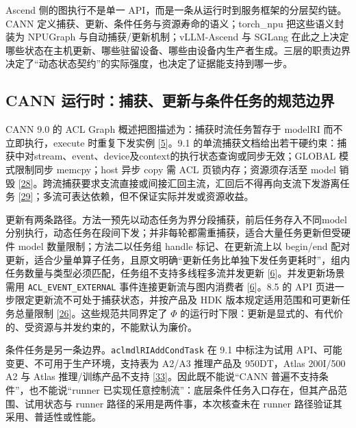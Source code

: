 \documentclass[
  UTF8,
  zihao=5]{ctexart}
\begin{document}
Ascend 侧的图执行不是单一
API，而是一条从运行时到服务框架的分层契约链。CANN
定义捕获、更新、条件任务与资源寿命的语义；torch\_npu 把这些语义封装为
NPUGraph 与自动捕获/更新机制；vLLM-Ascend 与 SGLang
在此之上决定哪些状态在主机更新、哪些驻留设备、哪些由设备内生产者生成。三层的职责边界决定了``动态状态契约''的实际强度，也决定了证据能支持到哪一步。

\hypertarget{cann-ux8fd0ux884cux65f6ux6355ux83b7ux66f4ux65b0ux4e0eux6761ux4ef6ux4efbux52a1ux7684ux89c4ux8303ux8fb9ux754c}{%
\subsection{CANN
运行时：捕获、更新与条件任务的规范边界}\label{cann-ux8fd0ux884cux65f6ux6355ux83b7ux66f4ux65b0ux4e0eux6761ux4ef6ux4efbux52a1ux7684ux89c4ux8303ux8fb9ux754c}}

CANN 9.0 的 ACL Graph 概述把图描述为：捕获时流任务暂存于 modelRI
而不立即执行，execute 时重复下发实例
{[}\protect\hyperlink{ref-cann900overview}{5}{]}。9.1
的单流捕获文档给出若干硬约束：捕获中对stream、event、device及context的执行状态查询或同步无效；GLOBAL
模式限制同步 memcpy；host 异步 copy 需 ACL 页锁内存；资源须存活至 model
销毁
{[}\protect\hyperlink{ref-cann910single}{28}{]}。跨流捕获要求支流直接或间接汇回主流，汇回后不得再向支流下发游离任务
{[}\protect\hyperlink{ref-cann910multi}{29}{]}；多流可表达依赖，但不保证实际并发或资源收益。

更新有两条路径。方法一预先以动态任务为界分段捕获，前后任务存入不同model分别执行，动态任务在段间下发；并非每轮都需重捕获，适合大量任务更新但受硬件
model 数量限制；方法二以任务组 handle 标记、在更新流上以 begin/end
配对更新，适合少量单算子任务，且原文明确``更新任务比单独下发任务更耗时''，组内任务数量与类型必须匹配，任务组不支持多线程多流并发更新
{[}\protect\hyperlink{ref-cann910update}{6}{]}。并发更新场景需用
\texttt{ACL\_EVENT\_EXTERNAL} 事件连接更新流与图内消费者
{[}\protect\hyperlink{ref-cann910update}{6}{]}。8.5 的 API
页进一步限定更新流不可处于捕获状态，并按产品及 HDK
版本规定适用范围和可更新任务总量限制
{[}\protect\hyperlink{ref-cann850updateapi}{26}{]}。这些规范共同界定了
\(\Phi\)
的运行时下限：更新是显式的、有代价的、受资源与并发约束的，不能默认为廉价。

条件任务是另一条边界。\texttt{aclmdlRIAddCondTask} 在 9.1 中标注为试用
API、可能变更、不可用于生产环境，支持表为 A2/A3 推理产品及 950DT，Atlas
200I/500 A2 与 Atlas 推理/训练产品不支持
{[}\protect\hyperlink{ref-cann910conditional}{33}{]}。因此既不能说``CANN
普遍不支持条件''，也不能说``runner
已实现任意控制流''：底层条件任务入口存在，但其产品范围、试用状态与
runner 路径的采用是两件事，本次核查未在 runner
路径验证其采用、普适性或性能。
\end{document}
